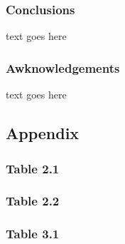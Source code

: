 \documentclass{beamer}
\begin{document}
\section*{}
\begin{frame}
  \frametitle{Conclusions}
  text goes here
 \end{frame}

 \begin{frame}
  \frametitle{Awknowledgements}
  text goes here
 \end{frame}


\subsection*{Appendix}
\begin{frame}
  \frametitle{Table 2.1}
 \end{frame}

\begin{frame}
  \frametitle{Table 2.2}
  
 \end{frame}

\begin{frame}
  \frametitle{Table 3.1}
  \tiny
  \centering
  \setlength{\tabcolsep}{5pt}
  
 \end{frame}


 
\end{document}
